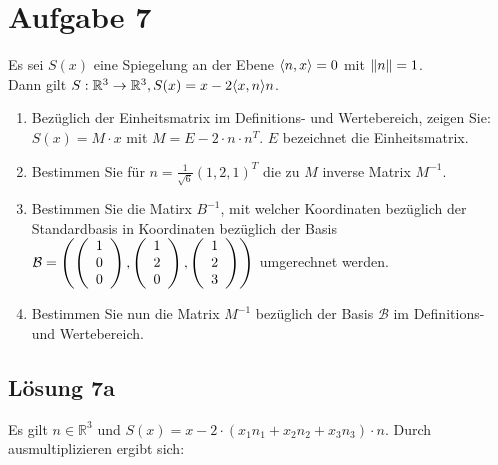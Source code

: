 \documentclass[main.tex]{subfiles}
\begin{document}
\section{Aufgabe 7}
Es sei $S(x)$ eine Spiegelung an der Ebene $\scalarprod{n,x} = 0$ mit $\norm{n} = 1$.\\
Dann gilt $S:\mathbb{R}^3 \to \mathbb{R}^3, S(x) = x-2 \scalarprod{x,n} n$.

\begin{enumerate}
    \item Bezüglich der Einheitsmatrix im Definitions- und Wertebereich, zeigen Sie:
    $S(x) = M\cdot x$ mit $M = E-2\cdot n \cdot n^T$. $E$ bezeichnet die Einheitsmatrix. 
    \item Bestimmen Sie für $n = \frac{1}{\sqrt{6}} (1, 2, 1)^T$ die zu $M$ inverse Matrix $M^{-1}$.
    \item Bestimmen Sie die Matirx $B^{-1}$, mit welcher Koordinaten bezüglich der Standardbasis in Koordinaten bezüglich der Basis
    $\mathcal{B} = \left( \eqmatrix{c}{1 \\ 0 \\ 0}, \eqmatrix{c}{1 \\ 2 \\ 0}, \eqmatrix{c}{1 \\ 2 \\ 3} \right)$ umgerechnet werden.
    \item Bestimmen Sie nun die Matrix $M^{-1}$ bezüglich der Basis $\mathcal{B}$ im Definitions- und Wertebereich.
\end{enumerate}

\subsection{Lösung 7a}

Es gilt $n\in \mathbb{R}^3$ und $S(x) = x - 2\cdot \left(x_1n_1 + x_2n_2 + x_3n_3\right) \cdot n$. Durch ausmultiplizieren ergibt sich:
\end{document}
